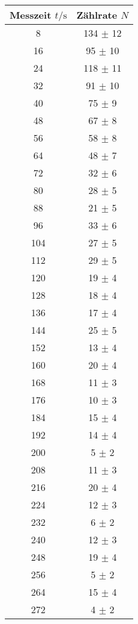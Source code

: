 \begin{table}[H]
  \centering
  \begin{tabular}{c c}
    \toprule
    Messzeit $t/\unit{\second}$ & Zählrate $N$\\
    \midrule
    8  &  134  $ \pm $  12  \\
    16  &  95  $ \pm $  10  \\
    24  &  118  $ \pm $  11  \\
    32  &  91  $ \pm $  10  \\
    40  &  75  $ \pm $  9  \\
    48  &  67  $ \pm $  8  \\
    56  &  58  $ \pm $  8  \\
    64  &  48  $ \pm $  7  \\
    72  &  32  $ \pm $  6  \\
    80  &  28  $ \pm $  5  \\
    88  &  21  $ \pm $  5  \\
    96  &  33  $ \pm $  6  \\
    104  &  27  $ \pm $  5  \\
    112  &  29  $ \pm $  5  \\
    120  &  19  $ \pm $  4  \\
    128  &  18  $ \pm $  4  \\
    136  &  17  $ \pm $  4  \\
    144  &  25  $ \pm $  5  \\
    152  &  13  $ \pm $  4  \\
    160  &  20  $ \pm $  4  \\
    168  &  11  $ \pm $  3  \\
    176  &  10  $ \pm $  3  \\
    184  &  15  $ \pm $  4  \\
    192  &  14  $ \pm $  4  \\
    200  &  5  $ \pm $  2  \\
    208  &  11  $ \pm $  3  \\
    216  &  20  $ \pm $  4  \\
    224  &  12  $ \pm $  3  \\
    232  &  6  $ \pm $  2  \\
    240  &  12  $ \pm $  3  \\
    248  &  19  $ \pm $  4  \\
    256  &  5  $ \pm $  2  \\
    264  &  15  $ \pm $  4  \\
    272  &  4  $ \pm $  2  \\

\end{tabular}
\end{table}
